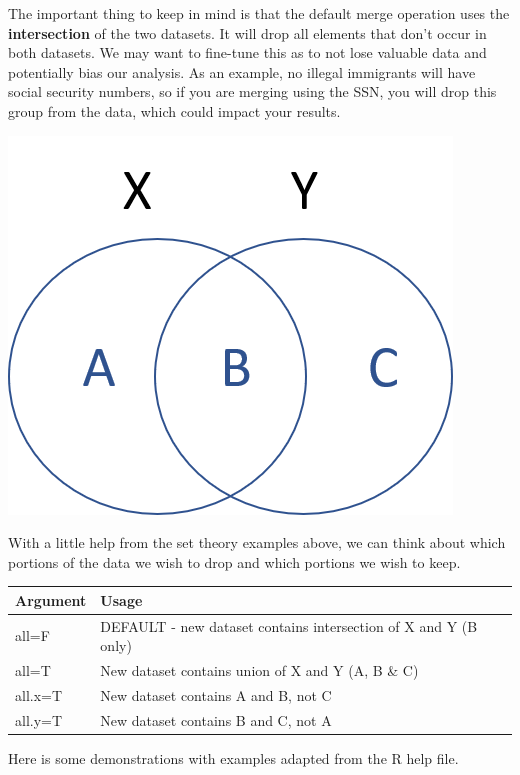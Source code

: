 \documentclass[]{book}
\theoremstyle{definition}
\theoremstyle{definition}
\theoremstyle{definition}
\theoremstyle{remark}
\begin{document}
The important thing to keep in mind is that the default merge operation
uses the \textbf{intersection} of the two datasets. It will drop all
elements that don't occur in both datasets. We may want to fine-tune
this as to not lose valuable data and potentially bias our analysis. As
an example, no illegal immigrants will have social security numbers, so
if you are merging using the SSN, you will drop this group from the
data, which could impact your results.

\includegraphics{figures/xy.png}

With a little help from the set theory examples above, we can think
about which portions of the data we wish to drop and which portions we
wish to keep.

\begin{longtable}[]{@{}ll@{}}
\toprule
Argument & Usage\tabularnewline
\midrule
\endhead
all=F & DEFAULT - new dataset contains intersection of X and Y (B
only)\tabularnewline
all=T & New dataset contains union of X and Y (A, B \& C)\tabularnewline
all.x=T & New dataset contains A and B, not C\tabularnewline
all.y=T & New dataset contains B and C, not A\tabularnewline
\bottomrule
\end{longtable}

Here is some demonstrations with examples adapted from the R help file.
\end{document}
